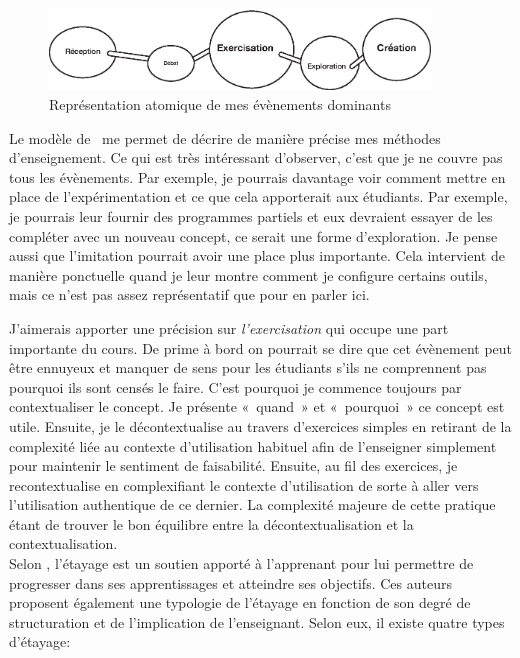 \begin{figure}[H]
    \begin{center}
        \includegraphics[width=0.9\textwidth]{figures/EAEs.eps}
        \caption{Représentation atomique de mes évènements dominants~\cite{leclercq2008modele}}
    \end{center}
\end{figure}
Le modèle de~\citet{perrenoud1992differenciation} me permet de décrire de manière précise mes méthodes d'enseignement. Ce qui est très intéressant d'observer, c'est que je ne couvre pas tous les évènements. Par exemple, je pourrais davantage voir comment mettre en place de l'expérimentation et ce que cela apporterait aux étudiants. Par exemple, je pourrais leur fournir des programmes partiels et eux devraient essayer de les compléter avec un nouveau concept, ce serait une forme d’exploration. Je pense aussi que l'imitation pourrait avoir une place plus importante. Cela intervient de manière ponctuelle quand je leur montre comment je configure certains outils, mais ce n'est pas assez représentatif que pour en parler ici.

J'aimerais apporter une précision sur \emph{l’exercisation} qui occupe une part importante du cours. De prime à bord on pourrait se dire que cet évènement peut être ennuyeux et manquer de sens pour les étudiants s'ils ne comprennent pas pourquoi ils sont censés le faire. C'est pourquoi je commence toujours par contextualiser le concept. Je présente «~quand~» et «~pourquoi~» ce concept est utile. Ensuite, je le décontextualise au travers d'exercices simples en retirant de la complexité liée au contexte d'utilisation habituel afin de l'enseigner simplement pour maintenir le sentiment de faisabilité. Ensuite, au fil des exercices, je recontextualise en complexifiant le contexte d'utilisation de sorte à aller vers l’utilisation authentique de ce dernier. La complexité majeure de cette pratique étant de trouver le bon équilibre entre la décontextualisation et la contextualisation.\\

Selon \citet{patry2004etayage}, l'étayage est un soutien apporté à l'apprenant pour lui permettre de progresser dans ses apprentissages et atteindre ses objectifs. Ces auteurs proposent également une typologie de l'étayage en fonction de son degré de structuration et de l'implication de l'enseignant. Selon eux, il existe quatre types d'étayage:

